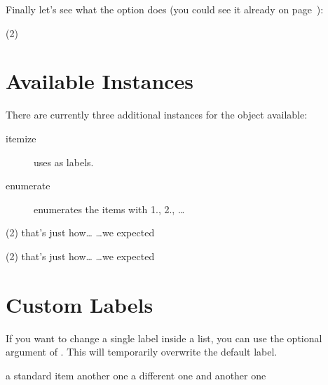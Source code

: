\documentclass{tasks-manual}
\begin{document}
Finally let's see what the  option does (you could see it
already on page~\pageref{debug}):
\begin{example}
  \begin{tasks}(2)
    \task \Sample
    \task \Sample
  \end{tasks}
\end{example}

\section{Available Instances}\label{sec:tasks:instances}
There are currently three additional instances for the  object
available:
\begin{description}
  \item[itemize] uses  as labels.
  \item[enumerate] enumerates the items with 1., 2., \ldots
\end{description}
\begin{example}
  \begin{tasks}[style=itemize](2)
    \task that's just how\ldots
    \task \ldots we expected
  \end{tasks}
  \begin{tasks}[style=enumerate](2)
    \task that's just how\ldots
    \task \ldots we expected
  \end{tasks}
\end{example}

\section{Custom Labels}
If you want to change a single label inside a list, you can use the optional
argument of . This will temporarily overwrite the default label.
\begin{example}
  \begin{tasks}[style=itemize]
    \task a standard item
    \task another one
    \task[+] a different one
    \task and another one
  \end{tasks}
\end{example}
\end{document}
